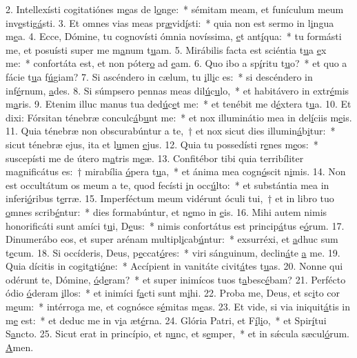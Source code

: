 2. Intellexísti cogitatiónes m\uline{e}as de l\uline{o}nge:~* sémitam meam, et funículum meum inv\uline{e}stig\uline{á}sti.
3. Et omnes vias meas pr\uline{æ}vid\uline{í}sti:~* quia non est sermo in l\uline{i}ngua m\uline{e}a.
4. Ecce, Dómine, tu cognovísti ómnia novíssima, \uline{e}t ant\uline{í}qua:~* tu formásti me, et posuísti super me m\uline{a}num t\uline{u}am.
5. Mirábilis facta est sciéntia t\uline{u}a \uline{e}x me:~* confortáta est, et non póter\uline{o} ad \uline{e}am.
6. Quo ibo a sp\uline{í}ritu t\uline{u}o?~* et quo a fácie t\uline{u}a f\uline{ú}giam?
7. Si ascéndero in cælum, tu \uline{i}ll\uline{i}c es:~* si descéndero in inf\uline{é}rnum, \uline{a}des.
8. Si súmpsero pennas meas dil\uline{ú}c\uline{u}lo,~* et habitávero in extr\uline{é}mis m\uline{a}ris.
9. Etenim illuc manus tua ded\uline{ú}c\uline{e}t me:~* et tenébit me d\uline{é}xtera t\uline{u}a.
10. Et dixi: Fórsitan ténebræ conculc\uline{á}b\uline{u}nt me:~* et nox illuminátio mea in del\uline{í}ciis m\uline{e}is.
11. Quia ténebræ non obscurabúntur a te,~† et nox sicut dies illumin\uline{á}b\uline{i}tur:~* sicut ténebræ ejus, ita et l\uline{u}men \uline{e}jus.
12. Quia tu possedísti r\uline{e}nes m\uline{e}os:~* suscepísti me de útero m\uline{a}tris m\uline{e}æ.
13. Confitébor tibi quia terribíliter magnificátus es:~† mirabília \uline{ó}pera t\uline{u}a,~* et ánima mea cogn\uline{ó}scit n\uline{i}mis.
14. Non est occultátum os meum a te, quod fecísti \uline{i}n occ\uline{ú}lto:~* et substántia mea in inferi\uline{ó}ribus t\uline{e}rræ.
15. Imperféctum meum vidérunt óculi tui,~† et in libro tuo \uline{o}mnes scrib\uline{é}ntur:~* dies formabúntur, et n\uline{e}mo in \uline{e}is.
16. Mihi autem nimis honorificáti sunt amíci t\uline{u}i, D\uline{e}us:~* nimis confortátus est princip\uline{á}tus e\uline{ó}rum.
17. Dinumerábo eos, et super arénam multipl\uline{i}cab\uline{ú}ntur:~* exsurréxi, et \uline{a}dhuc sum t\uline{e}cum.
18. Si occíderis, Deus, p\uline{e}ccat\uline{ó}res:~* viri sánguinum, declin\uline{á}te \uline{a} me.
19. Quia dícitis in cogit\uline{a}ti\uline{ó}ne:~* Accípient in vanitáte civit\uline{á}tes t\uline{u}as.
20. Nonne qui odérunt te, Dómine, \uline{ó}d\uline{e}ram?~* et super inimícos tuos t\uline{a}besc\uline{é}bam?
21. Perfécto ódio \uline{ó}deram \uline{i}llos:~* et inimíci f\uline{a}cti sunt m\uline{i}hi.
22. Proba me, Deus, et sc\uline{i}to cor m\uline{e}um:~* intérroga me, et cognósce s\uline{é}mitas m\uline{e}as.
23. Et vide, si via iniquit\uline{á}tis in m\uline{e} est:~* et deduc me in v\uline{i}a æt\uline{é}rna.
24. Glória Patri, et F\uline{í}l\uline{i}o,~* et Spir\uline{í}tui S\uline{a}ncto.
25. Sicut erat in princípio, et n\uline{u}nc, et s\uline{e}mper,~* et in sǽcula sæcul\uline{ó}rum. \uline{A}men.
